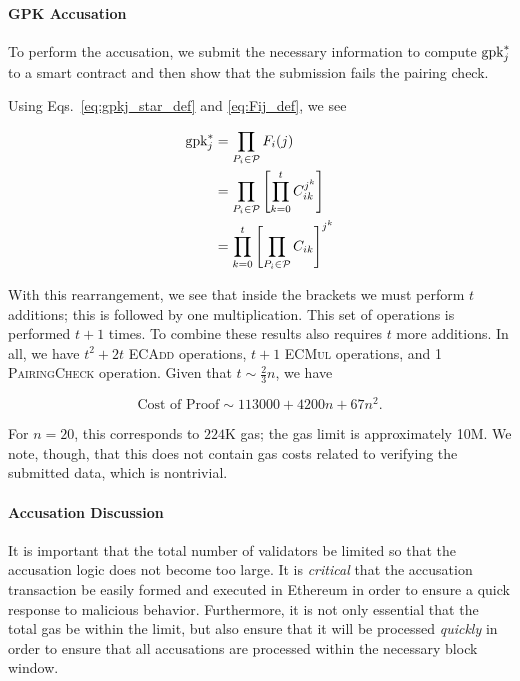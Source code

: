 \paragraph{GPK Accusation}
To perform the accusation, we submit the necessary information
to compute $\textrm{gpk}_{j}^{*}$ to a smart contract and then show
that the submission fails the pairing check.

Using Eqs.~\eqref{eq:gpkj_star_def} and \eqref{eq:Fij_def},
we see

\begin{align}
    \textrm{gpk}_{j}^{*} &= \prod_{P_{i}\in\mathcal{P}}F_{i}(j)
            \nonumber\\
        &= \prod_{P_{i}\in\mathcal{P}} \left[ \prod_{k=0}^{t} C_{ik}^{j^{k}} \right]
            \nonumber\\
        &= \prod_{k=0}^{t}
            \left[ \prod_{P_{i}\in\mathcal{P}} C_{ik} \right]^{j^{k}}
    \label{eq:gpkj_rearrange}
\end{align}

\noindent
With this rearrangement, we see that inside the brackets we must perform
$t$ additions; this is followed by one multiplication.
This set of operations is performed $t+1$ times.
To combine these results also requires $t$ more additions.
In all, we have $t^{2} + 2t$ \textsc{ECAdd} operations,
$t+1$ \textsc{ECMul} operations,
and 1 \textsc{PairingCheck} operation.
Given that $t \sim \frac{2}{3}n$, we have

\begin{equation}
    \text{Cost of Proof} \sim 113000 + 4200n + 67n^{2}.
\end{equation}

\noindent
For $n=20$, this corresponds to $224$K gas;
the gas limit is approximately 10M.
We note, though, that this does not contain gas costs related
to verifying the submitted data, which is nontrivial.



\paragraph{Accusation Discussion}
It is important that the total number of validators be limited
so that the accusation logic does not become too large.
It is \emph{critical} that the accusation transaction
be easily formed and executed in Ethereum in order to ensure
a quick response to malicious behavior.
Furthermore, it is not only essential that the total gas
be within the limit, but also ensure that it will be processed
\emph{quickly} in order to ensure that all accusations are
processed within the necessary block window.

